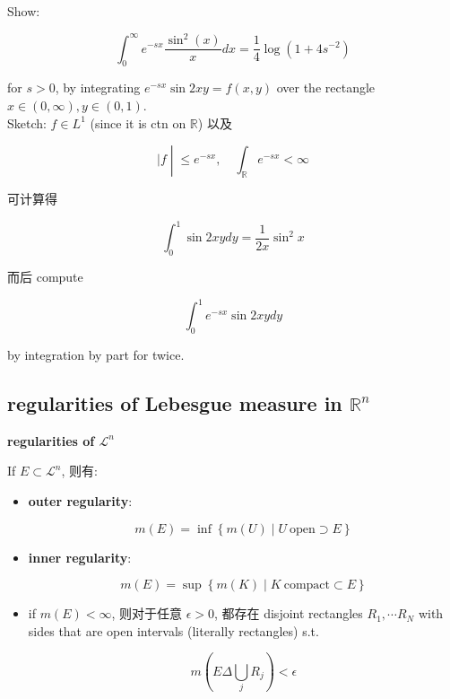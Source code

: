 \documentclass{qlnotes-export}
\begin{document}
\begin{example}

Show:

\[\int_{0}^{\infty}e^{- sx}\frac{\sin^{2}(x)}{x} dx = \frac{1}{4}\log(1 + 4s^{- 2})\]

for \(s > 0\), by integrating \(e^{- sx}\sin 2xy = f(x,y)\) over the rectangle \(x \in (0,\infty),y \in (0,1)\).\\
Sketch: \(f \in L^{1}\) (since it is ctn on \(\mathbb{R}\)) 以及

\[\left. |f \middle| \leq e^{- sx},\quad\int_{\mathbb{R}}e^{- sx} < \infty \right.\]

可计算得

\[\int_{0}^{1}\sin 2xy dy = \frac{1}{2x}\sin^{2}x\]

而后 compute

\[\int_{0}^{1}e^{- sx}\sin 2xy dy\]

by integration by part for twice.

\end{example}

\subsection{\texorpdfstring{regularities of Lebesgue measure in \({\mathbb{R}}^{n}\)}{regularities of Lebesgue measure in \{\textbackslash mathbb\{R\}\}\^{}\{n\}}}\label{regularities-of-lebesgue-measure-in-mathbbrn}

\begin{theorem}{\protect{}\label{kn-regularities-of-mathcal-l-n}{\textbf{regularities
of \(\mathcal{L}^{n}\)}}}

If \(E \subset \mathcal{L}^{n}\), 则有:

\begin{itemize}
\item
  \textbf{outer regularity}:

  \[m(E) = \inf\left\{ {m(U) \mid U\ \text{open} \supset E} \right\}\]
\item
  \textbf{inner regularity}:

  \[m(E) = \sup\left\{ {m(K) \mid K\ \text{compact} \subset E} \right\}\]
\item
  if \(m(E) < \infty\), 则对于任意 \(\epsilon > 0\), 都存在 disjoint rectangles \(R_{1},\cdots R_{N}\) with sides that are open intervals (literally rectangles) s.t.

  \[m(E\Delta\bigcup\limits_{j}R_{j}) < \epsilon\]
\end{itemize}

\end{theorem}
\end{document}
